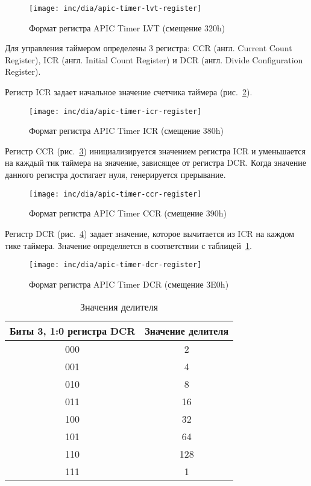 \begin{figure}[ht!]
  \centering
  \texttt{[image: inc/dia/apic-timer-lvt-register]}
  \caption{Формат регистра APIC Timer LVT (смещение 320h)}
  \label{fig:apic-timer-lvt-register}
\end{figure}

Для управления таймером определены 3 регистра: CCR (англ. Current Count Register),
ICR (англ. Initial Count Register) и DCR (англ. Divide Configuration Register).

Регистр ICR задает начальное значение счетчика таймера (рис.~\ref{fig:apic-timer-icr-register}).
\begin{figure}[ht!]
  \centering
  \texttt{[image: inc/dia/apic-timer-icr-register]}
  \caption{Формат регистра APIC Timer ICR (смещение 380h)}
  \label{fig:apic-timer-icr-register}
\end{figure}

Регистр CCR (рис.~\ref{fig:apic-timer-ccr-register}) инициализируется значением регистра ICR и
уменьшается на каждый тик таймера на значение, зависящее от регистра DCR. Когда значение
данного регистра достигает нуля, генерируется прерывание.
\begin{figure}[ht!]
  \centering
  \texttt{[image: inc/dia/apic-timer-ccr-register]}
  \caption{Формат регистра APIC Timer CCR (смещение 390h)}
  \label{fig:apic-timer-ccr-register}
\end{figure}

Регистр DCR (рис.~\ref{fig:apic-timer-dcr-register}) задает значение, которое вычитается из ICR
на каждом тике таймера. Значение определяется в соответствии с таблицей~\ref{tab:apic_timer_dcr_values}.
\begin{figure}[ht!]
  \centering
  \texttt{[image: inc/dia/apic-timer-dcr-register]}
  \caption{Формат регистра APIC Timer DCR (смещение 3E0h)}
  \label{fig:apic-timer-dcr-register}
\end{figure}

\begin{table}[ht!]
  \caption{Значения делителя}
  \label{tab:apic_timer_dcr_values}
  \begin{tabular}{|c|c|}
    \hline
    Биты 3, 1:0 регистра DCR & Значение делителя \\
    \hline
    000 & 2 \\
    \hline
    001 & 4 \\
    \hline
    010 & 8 \\
    \hline
    011 & 16 \\
    \hline
    100 & 32 \\
    \hline
    101 & 64 \\
    \hline
    110 & 128 \\
    \hline
    111 & 1 \\
    \hline
  \end{tabular}
\end{table}

